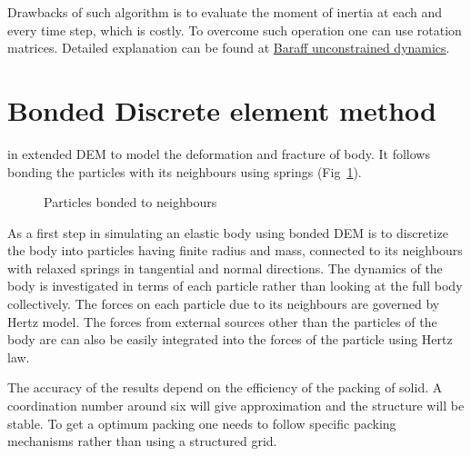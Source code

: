 Drawbacks of such algorithm is to evaluate the moment of inertia at each and
every time step, which is costly. To overcome such operation one can use
rotation matrices. Detailed explanation can be found at
\href{https://www.cs.cmu.edu/~baraff/sigcourse/notesd1.pdf}{Baraff unconstrained
  dynamics}.

\section{Bonded Discrete element method}
\label{sec:bond-discr-elem}

\citeauthor*{Potyondy_2004} in extended DEM to model the deformation and
fracture of body. It follows bonding the particles with its neighbours using
springs (Fig~\ref{fig:bonded_dem}).


\begin{figure}[htb]
  \centering
  \caption{Particles bonded to neighbours}
  \label{fig:bonded_dem}
\end{figure}

As a first step in simulating an elastic body using bonded DEM is to discretize
the body into particles having finite radius and mass, connected to its
neighbours with relaxed springs in tangential and normal directions. The
dynamics of the body is investigated in terms of each particle rather than
looking at the full body collectively. The forces on each particle due to its
neighbours are governed by Hertz model. The forces from external sources other
than the particles of the body are can also be easily integrated into the forces
of the particle using Hertz law.


The accuracy of the results depend on the efficiency of the packing of solid.  A
coordination number around six will give approximation and the structure will be
stable. To get a optimum packing one needs to follow specific packing mechanisms
rather than using a structured grid.


